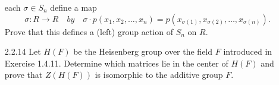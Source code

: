 \begin{enumerate}
                  each $\sigma \in S_n$ define a map
                  $$\sigma : R \rightarrow R \quad by \quad
                    \sigma \cdot p(x_1, x_2, \ldots, x_n) = p(x_{\sigma(1)},
                    x_{\sigma(2)}, \ldots, x_{\sigma(n)}).$$
                  Prove that this defines a (left) group action of $S_n$ on $R$.
   \item[2.2.14]  Let $H(F)$ be the Heisenberg group over the field $F$
                  introduced in Exercise 1.4.11. Determine which matrices lie in
                  the center of $H(F)$ and prove that $Z(H(F))$ is isomorphic to
                  the additive group $F$.
\end{enumerate}
